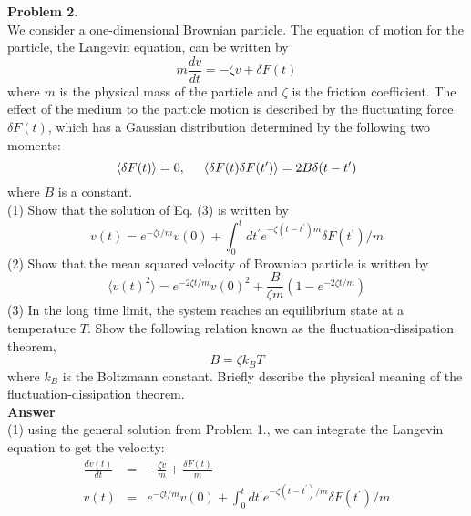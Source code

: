 \documentclass[paper=a4, fontsize=11pt]{scrartcl}
\numberwithin{equation}{section} %
\numberwithin{figure}{section} %
\numberwithin{table}{section} %
\begin{document}
\newpage
\textbf{Problem 2.}\\
We consider a one-dimensional Brownian particle. The equation of motion for the particle, the Langevin equation, can be written by
\begin{equation*}
m\frac{dv}{dt} = -\zeta v + \delta F(t)
\end{equation*} 
where $m$ is the physical mass of the particle and $\zeta$ is the friction coefficient. The effect of the medium to the particle motion is described by the fluctuating force $\delta F(t)$, which has a Gaussian distribution determined by the following two moments:
\begin{equation*}
\langle \delta F(t) \rangle = 0, \hspace{0.5cm} \langle \delta F(t) \delta F(t^\prime) \rangle = 2B \delta (t - t^{\prime})
\end{equation*}
where $B$ is a constant.\\
(1) Show that the solution of Eq. (3) is written by
\begin{equation*}
v(t) = e^{-\zeta t / m}v(0) + \int_0^t dt^\prime e^{-\zeta(t-t^\prime)m} \delta F(t^\prime)/m
\end{equation*}
(2) Show that the mean squared velocity of Brownian particle is written by
\begin{equation*}
\langle v(t)^2 \rangle = e^{-2 \zeta t/m}v(0)^2 + \frac{B}{\zeta m} \left(1-e^{-2\zeta t/m} \right)
\end{equation*}
(3) In the long time limit, the system reaches an equilibrium state at a temperature $T$. Show the following relation known as the fluctuation-dissipation theorem,
\begin{equation*}
B = \zeta k_B T
\end{equation*}
where $k_B$ is the Boltzmann constant. Briefly describe the physical meaning of the fluctuation-dissipation theorem.\\


\textbf{Answer}\\
(1) using the general solution from Problem 1., we can integrate the Langevin equation to get the velocity:
\begin{eqnarray*}
\frac{dv(t)}{dt} &=& -\frac{\zeta v}{m} + \frac{\delta F(t)}{m}\\
v(t) &=& e^{-\zeta t/m}v(0) + \int_0^t dt^\prime e^{-\zeta(t - t^\prime)/m} \delta F(t^\prime) /m\\
\end{eqnarray*}
\end{document}
